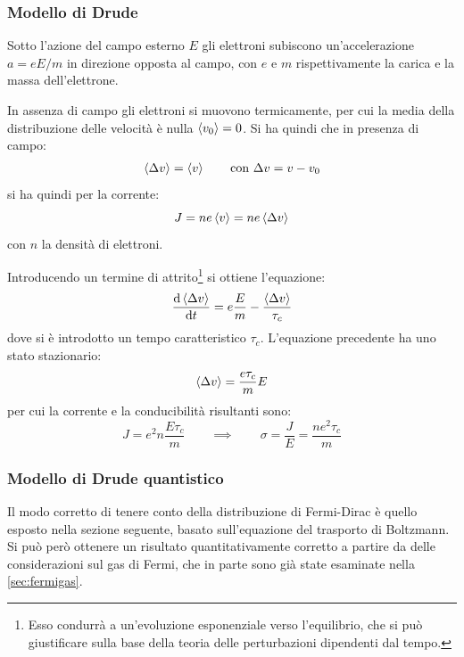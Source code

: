 \subsubsection{Modello di Drude}
Sotto l'azione del campo esterno $ E $ gli elettroni subiscono un'accelerazione $ a = e E /m $ in direzione opposta al campo, con $ e $ e $ m $ rispettivamente la carica e la massa dell'elettrone.

In assenza di campo gli elettroni si muovono termicamente, per cui la media della distribuzione delle velocità è nulla $ \expval{v_0} = 0 $. Si ha quindi che in presenza di campo:
\begin{align*}
\expval{\Delta v} = \expval{v} \qquad \text{con}~ \Delta v = v - v_0
\end{align*}
si ha quindi per la corrente:
\begin{equation*}
J = n e \expval{v} = n e \expval{\Delta v}
\end{equation*}
con $ n $ la densità di elettroni.

Introducendo un termine di attrito\footnote{Esso condurrà a un'evoluzione esponenziale verso l'equilibrio, che si può giustificare sulla base della teoria delle perturbazioni dipendenti dal tempo.} si ottiene l'equazione:
\begin{equation*}
\derivative{\expval{\Delta v}}{t} = e \frac{E}{m} - \frac{\expval{\Delta v}}{\tau_c}
\end{equation*}
dove si è introdotto un tempo caratteristico $ \tau_c $. L'equazione precedente ha uno stato stazionario:
\begin{equation*}
\expval{\Delta v} = \frac{e \tau_c}{m} E
\end{equation*}
per cui la corrente e la conducibilità risultanti sono:
\begin{equation*}
J = e^2 n \frac{E \tau_c}{m} \qquad \implies \qquad \sigma = \frac{J}{E} = \frac{n e^2 \tau_c}{m}
\end{equation*}

\subsubsection{Modello di Drude quantistico}

Il modo corretto di tenere conto della distribuzione di Fermi-Dirac è quello esposto nella sezione seguente, basato sull'equazione del trasporto di Boltzmann. Si può però ottenere un risultato quantitativamente corretto a partire da delle considerazioni sul gas di Fermi, che in parte sono già state esaminate nella \cref{sec:fermigas}.

